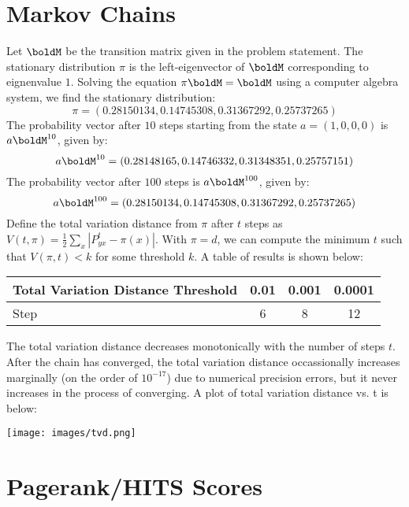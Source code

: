 \documentclass[11pt,letterpaper]{article}
\begin{document}
\section{Markov Chains}

Let $\boldM$ be the transition matrix given in the problem statement. The stationary distribution $\pi$ is the left-eigenvector of $\boldM$ corresponding to eignenvalue $1$. Solving the equation $\pi \boldM = \boldM$ using a computer algebra system, we find the stationary distribution:
\[ \pi = (0.28150134, 0.14745308, 0.31367292, 0.25737265) \]
The probability vector after $10$ steps starting from the state $a = (1,0,0,0)$ is $a \boldM^{10}$, given by:
\[ a \boldM^{10} = (0.28148165, 0.14746332, 0.31348351, 0.25757151) \]
The probability vector after $100$ steps is $a \boldM^{100}$, given by:
\[ a \boldM^{100} = (0.28150134, 0.14745308, 0.31367292, 0.25737265) \]
Define the total variation distance from $\pi$ after $t$ steps as $V(t, \pi) = \tfrac{1}{2}\sum_x |P^t_{yx} - \pi(x)|$. With $\pi = d$, we can compute the minimum $t$ such that $V(\pi,t) < k$ for some threshold $k$. A table of results is shown below:

\begin{table}[h!]
\begin{center}
\begin{tabular}{l|c|c|c}
\textbf{Total Variation Distance Threshold} & 0.01 & 0.001 & 0.0001 \\ \hline
Step & 6    & 8     & 12      \\
\end{tabular}
\end{center}
\end{table}

The total variation distance decreases monotonically with the number of steps $t$. After the chain has converged, the total variation distance occassionally increases marginally (on the order of $10^{-17}$) due to numerical precision errors, but it never increases in the process of converging. A plot of total variation distance vs. t is below:

\begin{center}
\texttt{[image: images/tvd.png]}
\end{center}



\section{Pagerank/HITS Scores}
\end{document}

